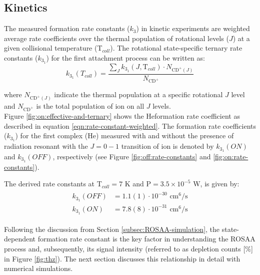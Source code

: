 \subsection{Kinetics}
\label{subsec:CD+-kinetics}

The measured formation rate constants ($k_3$) in kinetic experiments are 
weighted average rate coefficients over the thermal population of rotational
levels ($J$) at a given collisional temperature (T$_{coll}$). The rotational
state-specific ternary rate constants ($k_{3_1}$) for the first attachment process can be written as:
\begin{equation}
    k_{3_1} (T_{coll}) = \frac{\sum_{J} k_{3_1} (J, \text{T}_{coll}) \cdot N_{\text{CD}^+ (J)} }{N_{\text{CD}^+}}
    \label{eqn:rate-constant-weighted}
\end{equation}

where $N_{\text{CD}^+ (J)}$ indicate the thermal population at a specific rotational $J$ level 
and $N_{\text{CD}^+}$ is the total population of \CD ion on all $J$ levels.\\


Figure \ref{fig:on:effective-and-ternary} shows the He\CD formation rate
coefficient as described in equation \ref{eqn:rate-constant-weighted}. The
formation rate coefficients ($k_{3_1}$) for the first complex (He\CD) measured with and without the presence of radiation resonant with the $J=0-1$ transition of \CD ion is denoted by $k_{3_1}(ON)$ and
$k_{3_1}(OFF)$, respectively (see Figure \ref{fig:off:rate-constants} and \ref{fig:on:rate-constants}).

The derived rate constants at T$_{coll}=7$ K and P$=3.5\times 10^{-5}$ W, is given by:
\begin{align}
    \label{eqn:k-on-off}
    \begin{split}
        k_{3_1}(OFF) &= 1.1(1) \cdot 10^{-30} \text{ cm}^6/\text{s}\\
        k_{3_1}(ON) &= 7.8(8) \cdot 10^{-31} \text{ cm}^6/\text{s}
    \end{split}
\end{align}

Following the discussion from Section \ref{subsec:ROSAA-simulation}, the
state-dependent formation rate constant is the key factor in understanding the
ROSAA process and, subsequently, its signal intensity (referred to as depletion
counts [\%] in Figure \ref{fig:thz}). The next section discusses this
relationship in detail with numerical simulations.


